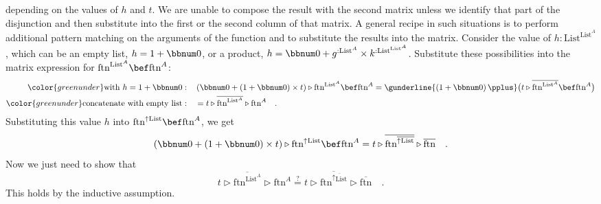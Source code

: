 depending on the values of $h$ and $t$. We are unable to compose
the result with the second matrix unless we identify that part of
the disjunction and then substitute into the first or the second column
of that matrix. A general recipe in such situations is to perform
additional pattern matching on the arguments of the function and to
substitute the results into the matrix. Consider the value of $h:\text{List}^{\text{List}^{A}}$,
which can be an empty list, $h=1+\bbnum 0$, or a product, $h=\bbnum 0+g^{:\text{List}^{A}}\times k^{:\text{List}^{\text{List}^{A}}}$.
Substitute these possibilities into the matrix expression for $\text{ftn}^{\text{List}^{A}}\bef\text{ftn}^{A}$:
\begin{align*}
{\color{greenunder}\text{with }h=1+\bbnum 0:}\quad & \left(\bbnum 0+\left(1+\bbnum 0\right)\times t\right)\triangleright\text{ftn}^{\text{List}^{A}}\bef\text{ftn}^{A}=\gunderline{\left(1+\bbnum 0\right)\pplus}\big(t\triangleright\overline{\text{ftn}^{\text{List}^{A}}}\bef\text{ftn}^{A}\big)\\
{\color{greenunder}\text{concatenate with empty list}:}\quad & =t\triangleright\overline{\text{ftn}^{\text{List}^{A}}}\triangleright\text{ftn}^{A}\quad.
\end{align*}
Substituting this value $h$ into $\text{ftn}^{\uparrow\text{List}}\bef\text{ftn}^{A}$,
we get 
\[
\left(\bbnum 0+\left(1+\bbnum 0\right)\times t\right)\triangleright\text{ftn}^{\uparrow\text{List}}\bef\text{ftn}^{A}=t\triangleright\overline{\text{ftn}^{\overline{\uparrow\text{List}}}}\triangleright\overline{\text{ftn}}\quad.
\]
Now we just need to show that
\[
t\triangleright\overline{\text{ftn}^{\text{List}^{A}}}\triangleright\text{ftn}^{A}\overset{?}{=}t\triangleright\overline{\text{ftn}^{\overline{\uparrow\text{List}}}}\triangleright\overline{\text{ftn}}\quad.
\]
This holds by the inductive assumption.

